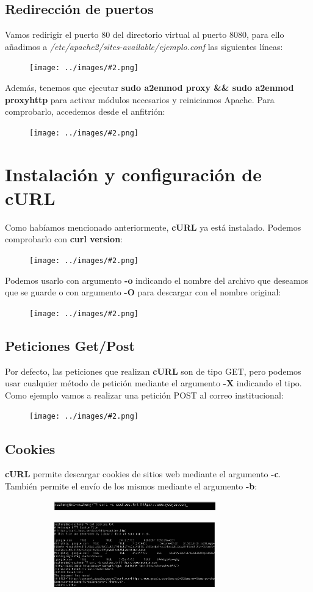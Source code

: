 \documentclass[twoside]{article}
\newcommand{\image}[2]{
\begin{figure}[H]
    \texttt{[image: ../images/\#2.png]}
    \centering
\end{figure}
}
\begin{document}
\subsection{Redirección de puertos}
Vamos redirigir el puerto $80$ del directorio virtual al puerto $8080$, para ello añadimos a \textit{/etc/apache2/sites-available/ejemplo.conf} las siguientes líneas: 
\image{6}{25}
Además, tenemos que ejecutar \textbf{sudo a2enmod proxy \&\& sudo a2enmod proxy\textunderscore http} para activar módulos necesarios y reiniciamos Apache. Para comprobarlo, accedemos desde el anfitrión:
\image{6}{26}
\section{Instalación y configuración de cURL}
Como habíamos mencionado anteriormente, \textbf{cURL} ya está instalado. Podemos comprobarlo con \textbf{curl \textendash\textendash version}:
\image{8}{27}
Podemos usarlo con argumento \textbf{-o} indicando el nombre del archivo que deseamos que se guarde o con argumento \textbf{-O} para descargar con el nombre original:
\image{8}{28}
\subsection{Peticiones Get/Post}
Por defecto, las peticiones que realizan \textbf{cURL} son de tipo GET, pero podemos usar cualquier método de petición mediante el argumento \textbf{-X} indicando el tipo. Como ejemplo vamos a realizar una petición POST al correo institucional:
\image{8}{29}
\subsection{Cookies}
\textbf{cURL} permite descargar cookies de sitios web mediante el argumento \textbf{-c}. También permite el envío de los mismos mediante el argumento \textbf{-b}:
\begin{figure}[H]
    \centering
    \begin{subfigure}{.5\textwidth}
        \centering
        \includegraphics[width=7cm]{../images/30.png}
    \end{subfigure}%
    \begin{subfigure}{.5\textwidth}
        \centering
        \includegraphics[width=7cm]{../images/31.png}
    \end{subfigure}
\end{figure}
\end{document}
